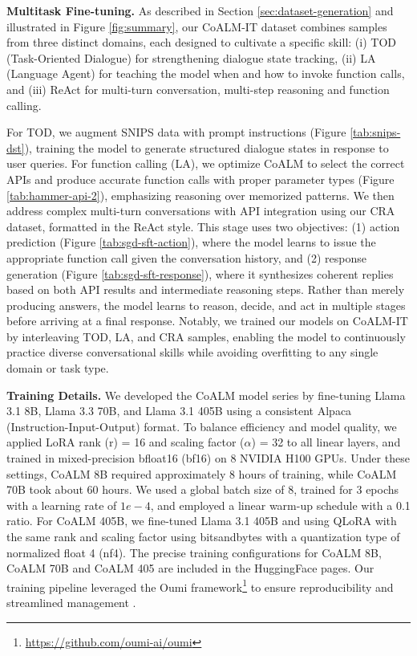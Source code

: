 \vspace{3mm}

\noindent\textbf{Multitask Fine-tuning.}  As described in Section \ref{sec:dataset-generation} and illustrated in Figure \ref{fig:summary}, our CoALM-IT dataset combines samples from three distinct domains, each designed to cultivate a specific skill: (i) TOD (Task-Oriented Dialogue) for strengthening dialogue state tracking, (ii) LA (Language Agent) for teaching the model when and how to invoke function calls, and (iii) ReAct for multi-turn conversation, multi-step reasoning and function calling.

For TOD, we augment SNIPS data with prompt instructions (Figure \ref{tab:snips-dst}), training the model to generate structured dialogue states in response to user queries. For function calling (LA), we optimize CoALM to select the correct APIs and produce accurate function calls with proper parameter types (Figure \ref{tab:hammer-api-2}), emphasizing reasoning over memorized patterns. We then address complex multi-turn conversations with API integration using our CRA dataset, formatted in the ReAct style. This stage uses two objectives: (1) action prediction (Figure \ref{tab:sgd-sft-action}), where the model learns to issue the appropriate function call given the conversation history, and (2) response generation (Figure \ref{tab:sgd-sft-response}), where it synthesizes coherent replies based on both API results and intermediate reasoning steps. Rather than merely producing answers, the model learns to reason, decide, and act in multiple stages before arriving at a final response. Notably, we trained our models on CoALM-IT by interleaving TOD, LA, and CRA samples, enabling the model to continuously practice diverse conversational skills while avoiding overfitting to any single domain or task type.

\vspace{3mm}

\noindent\textbf{Training Details.} We developed the CoALM model series by fine-tuning Llama 3.1 8B, Llama 3.3 70B, and Llama 3.1 405B \cite{Dubey2024TheL3-llama3} using a consistent Alpaca (Instruction-Input-Output) format. To balance efficiency and model quality, we applied LoRA \cite{hu2021lora} rank (r) = 16 and scaling factor ($\alpha$) = 32 to all linear layers, and trained in mixed-precision bfloat16 (bf16) on 8 NVIDIA H100 GPUs. Under these settings, CoALM 8B required approximately 8 hours of training, while CoALM 70B took about 60 hours. We used a global batch size of 8, trained for 3 epochs with a learning rate of $1e-4$, and employed a linear warm-up schedule with a 0.1 ratio. For CoALM 405B, we fine-tuned Llama 3.1 405B and using QLoRA \cite{dettmers2023qloraefficientfinetuningquantized} with the same rank and scaling factor using bitsandbytes \cite{bitsandbytes} with a quantization type of normalized float 4 (nf4). The precise  training configurations for CoALM 8B, CoALM 70B and CoALM 405 are included in the HuggingFace pages. Our training pipeline leveraged the Oumi framework\footnote{\url{https://github.com/oumi-ai/oumi}} to ensure reproducibility and streamlined management \cite{oumi2025}.


